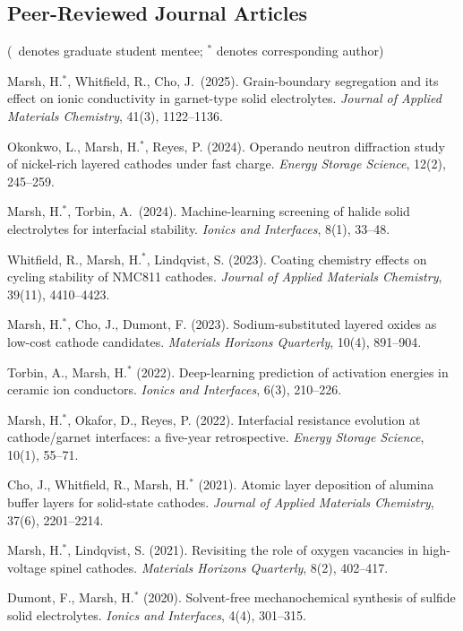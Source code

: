 \documentclass[11pt,a4paper]{moderncv}
\begin{document}
\subsection{Peer-Reviewed Journal Articles}
{\small \noindent (\dag\ denotes graduate student mentee; \(^{*}\) denotes corresponding author)}
\begin{enumerate}[leftmargin=*,itemsep=3pt,topsep=6pt,label={[J\arabic*]}]
\item Marsh, H.\(^{*}\), Whitfield, R.\dag, Cho, J.\dag\ (2025). Grain-boundary segregation and its effect on ionic conductivity in garnet-type solid electrolytes. \textit{Journal of Applied Materials Chemistry}, 41(3), 1122--1136.
\item Okonkwo, L.\dag, Marsh, H.\(^{*}\), Reyes, P. (2024). Operando neutron diffraction study of nickel-rich layered cathodes under fast charge. \textit{Energy Storage Science}, 12(2), 245--259.
\item Marsh, H.\(^{*}\), Torbin, A.\dag\ (2024). Machine-learning screening of halide solid electrolytes for interfacial stability. \textit{Ionics and Interfaces}, 8(1), 33--48.
\item Whitfield, R.\dag, Marsh, H.\(^{*}\), Lindqvist, S. (2023). Coating chemistry effects on cycling stability of NMC811 cathodes. \textit{Journal of Applied Materials Chemistry}, 39(11), 4410--4423.
\item Marsh, H.\(^{*}\), Cho, J.\dag, Dumont, F. (2023). Sodium-substituted layered oxides as low-cost cathode candidates. \textit{Materials Horizons Quarterly}, 10(4), 891--904.
\item Torbin, A.\dag, Marsh, H.\(^{*}\) (2022). Deep-learning prediction of activation energies in ceramic ion conductors. \textit{Ionics and Interfaces}, 6(3), 210--226.
\item Marsh, H.\(^{*}\), Okafor, D., Reyes, P. (2022). Interfacial resistance evolution at cathode/garnet interfaces: a five-year retrospective. \textit{Energy Storage Science}, 10(1), 55--71.
\item Cho, J.\dag, Whitfield, R.\dag, Marsh, H.\(^{*}\) (2021). Atomic layer deposition of alumina buffer layers for solid-state cathodes. \textit{Journal of Applied Materials Chemistry}, 37(6), 2201--2214.
\item Marsh, H.\(^{*}\), Lindqvist, S. (2021). Revisiting the role of oxygen vacancies in high-voltage spinel cathodes. \textit{Materials Horizons Quarterly}, 8(2), 402--417.
\item Dumont, F.\dag, Marsh, H.\(^{*}\) (2020). Solvent-free mechanochemical synthesis of sulfide solid electrolytes. \textit{Ionics and Interfaces}, 4(4), 301--315.

\end{enumerate}
\end{document}
